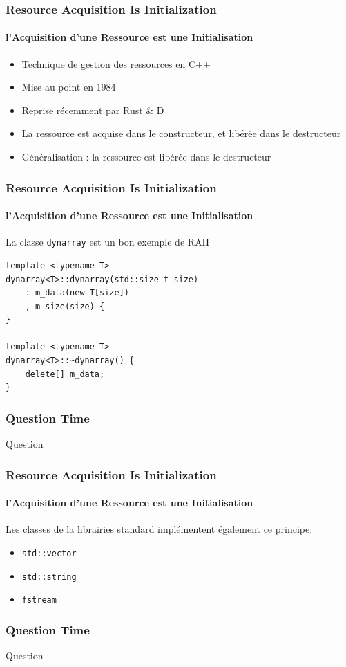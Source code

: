 \documentclass[xetex,mathserif]{beamer}
\newcounter{QC}
\begin{document}
\begin{frame}[fragile]
\frametitle{Resource Acquisition Is Initialization}
\framesubtitle{l'Acquisition d'une Ressource est une Initialisation}
\begin{itemize}
	\item Technique de gestion des ressources en C++
	\item Mise au point en 1984
	\item Reprise récemment par Rust \& D
	\item La ressource est acquise dans le constructeur, et libérée dans le destructeur
	\item Généralisation : la ressource est libérée dans le destructeur
\end{itemize}
\end{frame}


\begin{frame}[fragile]
\frametitle{Resource Acquisition Is Initialization}
\framesubtitle{l'Acquisition d'une Ressource est une Initialisation}

La classe \lstinline{dynarray} est un bon exemple de RAII

\begin{lstlisting}
template <typename T>
dynarray<T>::dynarray(std::size_t size)
    : m_data(new T[size])
    , m_size(size) {	
}

template <typename T>
dynarray<T>::~dynarray() {
    delete[] m_data;	
}
\end{lstlisting}
\end{frame}

\begin{frame}
\frametitle{Question Time}
\huge Question  
\end{frame}

\begin{frame}[fragile]
\frametitle{Resource Acquisition Is Initialization}
\framesubtitle{l'Acquisition d'une Ressource est une Initialisation}
Les classes de la librairies standard implémentent également ce principe:
\begin{itemize}
	\item \lstinline{std::vector}
	\item \lstinline{std::string}
	\item \lstinline{fstream}
\end{itemize}
\end{frame}

\begin{frame}
\frametitle{Question Time}
\huge Question  
\end{frame}
\end{document}
